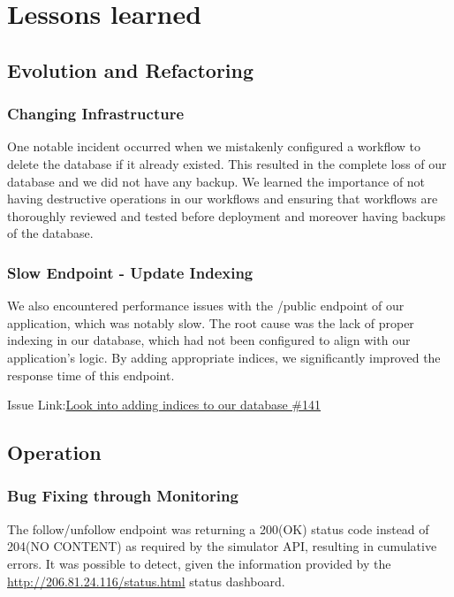 \section{Lessons learned}
\subsection{Evolution and Refactoring}

\subsubsection{Changing Infrastructure}
One notable incident occurred when we mistakenly configured a workflow to delete the database if it already existed. This resulted in the complete loss of our database and we did not have any backup. We learned the importance of not having destructive operations in our workflows and ensuring that workflows are thoroughly reviewed and tested before deployment and moreover having backups of the database.

\subsubsection{Slow Endpoint - Update Indexing}
We also encountered performance issues with the /public endpoint of our application, which was notably slow. The root cause was the lack of proper indexing in our database, which had not been configured to align with our application's logic. By adding appropriate indices, we significantly improved the response time of this endpoint.

Issue Link:\href{https://github.com/DevopsGroupC/Minitwit/issues/141}{\color{blue}Look into adding indices to our database \#141}

\subsection{Operation}

\subsubsection{Bug Fixing through Monitoring}
The follow/unfollow endpoint was returning a 200(OK) status code instead of 204(NO CONTENT) as required by the simulator API, resulting in cumulative errors. It was possible to detect, given the information provided by the \href{http://206.81.24.116/status.html}{http://206.81.24.116/status.html} status dashboard.


